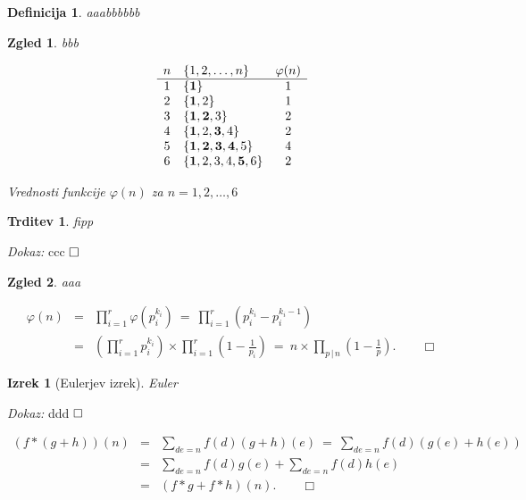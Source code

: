 \documentclass[a4paper,12pt]{article}
\def\qed{$\hfill\Box$}   %
\def\qedm{\qquad\Box}   %
\newtheorem{izrek}{Izrek}
\newtheorem{trditev}{Trditev}
\newtheorem{definicija}{Definicija}
\newtheorem{zgled}{Zgled}
\begin{document}
\begin{definicija}
aaabbbbbb
\end{definicija}

\begin{zgled}
bbb
\begin{table}[h]
\[
\begin{array}{clc}
 n & \{1,2,\ldots, n\}          & \varphi(n)       \\
 \hline
 1 & \{{\bf 1}\}                    &     1      \\
 2 & \{{\bf 1},2 \}                &     1      \\
 3 & \{{\bf 1,2},3 \}             &     2      \\
 4 & \{{\bf 1},2,{\bf 3},4 \} &     2      \\
 5 & \{{\bf 1,2,3,4},5 \}       &     4      \\
 6 & \{{\bf 1},2,3,4,{\bf 5},6 \} &     2
\end{array}
\] 
\caption{Vrednosti funkcije $\varphi(n)$ za $n = 1,2,\ldots,6$}\label{fi}
\end{table}


\end{zgled}



\begin{trditev}
\label{fipp}
fipp
\end{trditev}

\noindent
{\em Dokaz:\/} ccc
\qed


\begin{zgled}
aaa
\end{zgled}


\begin{eqnarray*}
\varphi(n) &=& \prod_{i=1}^r \varphi\left(p_i^{k_i}\right)
\ =\ \prod_{i=1}^r \left(p_i^{k_i} - p_i^{k_i-1}\right) \\
 &=& \left(\prod_{i=1}^r p_i^{k_i}\right) \times \prod_{i=1}^r \left(1 - \frac{1}{p_i}\right)
\ =\ n \times \prod_{p\,|\,n} \left(1 - \frac{1}{p}\right). \qedm
\end{eqnarray*}


\begin{izrek}[Eulerjev izrek]
Euler
\end{izrek}

\noindent
{\em Dokaz:\/} ddd \qed




\begin{eqnarray*}
(f * (g + h))(n) &=& \sum_{d e = n} f(d)(g+h)(e)
\ =\ \sum_{d e = n} f(d)(g(e)+h(e)) \\
 &=& \sum_{d e = n} f(d)g(e) + \sum_{d e = n} f(d)h(e) \\
 &=& (f * g + f * h)(n). \qedm
\end{eqnarray*}
\end{document}

